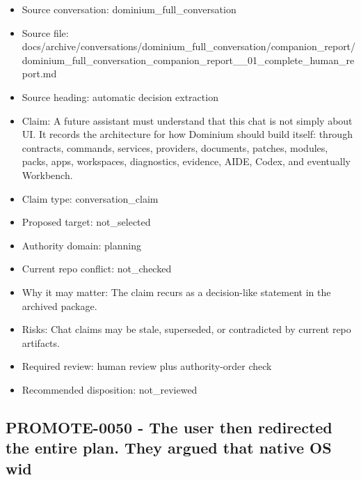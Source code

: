 \documentclass[11pt,a4paper]{report}
\begin{document}
\begin{itemize}
\item Source conversation: dominium\_full\_conversation
\item Source file: docs/archive/conversations/dominium\_full\_conversation/companion\_report/dominium\_full\_conversation\_companion\_report\_\_01\_complete\_human\_report.md
\item Source heading: automatic decision extraction
\item Claim: A future assistant must understand that this chat is not simply about UI. It records the architecture for how Dominium should build itself: through contracts, commands, services, providers, documents, patches, modules, packs, apps, workspaces, diagnostics, evidence, AIDE, Codex, and eventually Workbench.
\item Claim type: conversation\_claim
\item Proposed target: not\_selected
\item Authority domain: planning
\item Current repo conflict: not\_checked
\item Why it may matter: The claim recurs as a decision-like statement in the archived package.
\item Risks: Chat claims may be stale, superseded, or contradicted by current repo artifacts.
\item Required review: human review plus authority-order check
\item Recommended disposition: not\_reviewed
\end{itemize}

\subsection{PROMOTE-0050 - The user then redirected the entire plan. They argued that native OS wid}
\end{document}
